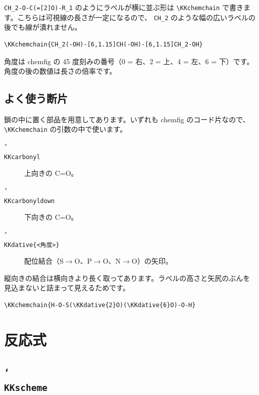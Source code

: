 \documentclass[paper=a4paper,fontsize=10pt]{jlreq}
\begin{document}
\verb|CH_2-O-C(=[2]O)-R_1| のようにラベルが横に並ぶ形は
\verb|\KKchemchain| で書きます。こちらは可視線の長さが一定になるので、
\verb|CH_2| のような幅の広いラベルの後でも線が潰れません。

\begin{verbatim}
\KKchemchain{CH_2(-OH)-[6,1.15]CH(-OH)-[6,1.15]CH_2-OH}
\end{verbatim}

\begin{center}
\KKglycerol\qquad{}
\end{center}

角度は \textsf{chemfig} の 45 度刻みの番号（0 = 右、2 = 上、4 = 左、6 = 下）です。
角度の後の数値は長さの倍率です。

\subsection{よく使う断片}

鎖の中に置く部品を用意してあります。いずれも \textsf{chemfig} のコード片なので、
\verb|\KKchemchain| の引数の中で使います。

\begin{description}
\item[\texttt{\char`\\KKcarbonyl}] 上向きの C=O。
\item[\texttt{\char`\\KKcarbonyldown}] 下向きの C=O。
\item[\texttt{\char`\\KKdative\{<角度>\}}] 配位結合（S$\to$O、P$\to$O、N$\to$O）の矢印。
\end{description}

縦向きの結合は横向きより長く取ってあります。ラベルの高さと矢尻のぶんを
見込まないと詰まって見えるためです。

\begin{verbatim}
\KKchemchain{H-O-S(\KKdative{2}O)(\KKdative{6}O)-O-H}
\end{verbatim}

\begin{center}
\KKsulfuricacid\qquad\KKnitricacid\qquad\KKphosphoricacid
\end{center}

\section{反応式}

\subsection{\texttt{\char`\\KKscheme}}
\end{document}
